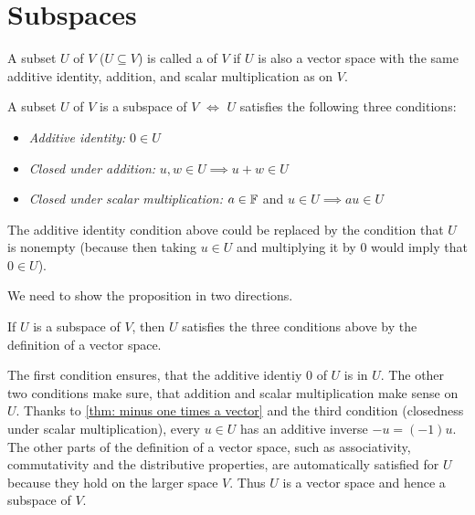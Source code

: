 \section{Subspaces}

\begin{mydef} [subspace]
  A subset $U$ of $V$ ($U \subseteq V$) is called a  of $V$ if $U$ is also a vector space with the same additive identity, addition, and scalar multiplication as on $V$.
\end{mydef}

\begin{thm} 
  \label{thm: conditions for a subspace}
  A subset $U$ of $V$ is a subspace of $V$ $\iff$ $U$ satisfies the following three conditions:
  \begin{itemize}
    \item \emph{Additive identity:}
    $0 \in U$
    \item \emph{Closed under addition:}
    $u,w \in U \implies u+w \in U$
    \item \emph{Closed under scalar multiplication:}
    $a \in \mathbb{F}$ and $u \in U \implies au \in U$
  \end{itemize}
  The additive identity condition above could be replaced by the condition that $U$ is nonempty (because then taking $u \in U$ and multiplying it by $0$ would imply that $0\in U$).
\end{thm}
\begin{prf} We need to show the proposition in two directions.
  \begin{description}
    \item{} If $U$ is a subspace of $V$, then $U$ satisfies the three conditions above by the definition of a vector space.
    \item{} The first condition ensures, that the additive identiy $0$ of $U$ is in $U$. The other two conditions make sure, that addition and scalar multiplication make sense on $U$.
    Thanks to \ref{thm: minus one times a vector} and the third condition (closedness under scalar multiplication), every $u \in U$ has an additive inverse $-u = (-1) u$.
    The other parts of the definition of a vector space, such as associativity, commutativity and the distributive properties, are automatically satisfied for $U$ because they hold on the larger space $V$. Thus $U$ is a vector space and hence a subspace of $V$.
  \end{description}
  \vspace*{-\baselineskip}
\end{prf}

